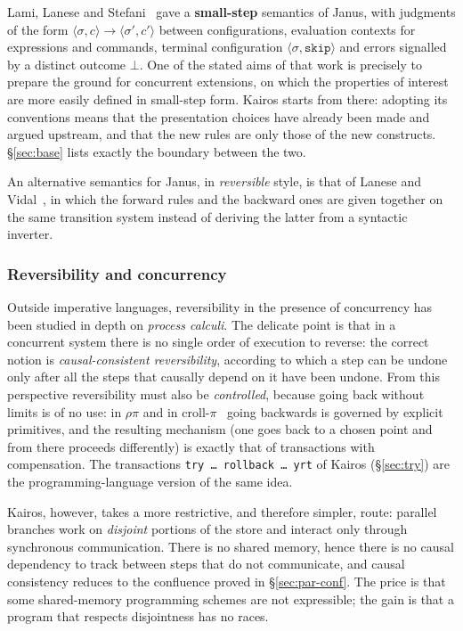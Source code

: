 Lami, Lanese and Stefani~\cite{LamiLaneseStefani2024} gave a
\textbf{small-step} semantics of Janus, with judgments of the form $\langle \sigma, c\rangle
\to \langle \sigma', c'\rangle$ between configurations, evaluation contexts for
expressions and commands, terminal configuration $\langle \sigma,
\mathtt{skip}\rangle$ and errors signalled by a distinct outcome $\bot$. One of the
stated aims of that work is precisely to prepare the ground for concurrent extensions,
on which the properties of interest are more easily defined in small-step form. Kairos starts from there: adopting
its conventions means that the presentation choices have already been made and argued
upstream, and that the new rules are only those of the new constructs. 
\S\ref{sec:base} lists exactly the boundary between the two.

An alternative semantics for Janus, in \emph{reversible} style, is that of
Lanese and Vidal~\cite{LaneseVidal2026}, in which the forward rules and the backward
ones are given together on the same transition system instead of
deriving the latter from a syntactic inverter.

\subsubsection{Reversibility and concurrency}

Outside imperative languages, reversibility in the presence of concurrency has
been studied in depth on \emph{process calculi}. The delicate point is that
in a concurrent system there is no single order of execution to
reverse: the correct notion is \emph{causal-consistent
reversibility}, according to which a step can be undone only after all the steps that
causally depend on it have been undone. From this perspective
reversibility must also be \emph{controlled}, because going back without limits
is of no use: in $\rho\pi$ and in
croll-$\pi$~\cite{LaneseMezzinaSchmittStefani2011,%
LaneseLienhardtMezzinaSchmittStefani2013} going backwards is governed by
explicit primitives, and the resulting mechanism (one goes back to
a chosen point and from there proceeds differently) is exactly that of
transactions with compensation. The transactions
\texttt{try\,\dots\,rollback\,\dots\,yrt} of Kairos (\S\ref{sec:try}) are the
programming-language version of the same idea.

Kairos, however, takes a more restrictive, and therefore simpler, route: parallel
branches work on \emph{disjoint} portions of the store and interact
only through synchronous communication. There is no shared memory, hence there is no
causal dependency to track between steps that do not communicate, and causal consistency
reduces to the confluence proved in \S\ref{sec:par-conf}. The price
is that some shared-memory programming schemes are not expressible;
the gain is that a program that respects disjointness has no races.

